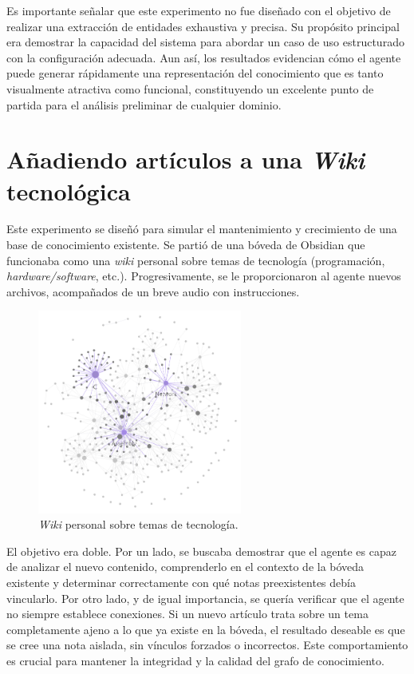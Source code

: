 Es importante señalar que este experimento no fue diseñado con el objetivo de realizar una extracción de entidades exhaustiva y precisa. Su propósito principal era demostrar la capacidad del sistema para abordar un caso de uso estructurado con la configuración adecuada. Aun así, los resultados evidencian cómo el agente puede generar rápidamente una representación del conocimiento que es tanto visualmente atractiva como funcional, constituyendo un excelente punto de partida para el análisis preliminar de cualquier dominio.

\section{Añadiendo artículos a una \textit{Wiki} tecnológica}
Este experimento se diseñó para simular el mantenimiento y crecimiento de una base de conocimiento existente. Se partió de una bóveda de Obsidian que funcionaba como una \textit{wiki} personal sobre temas de tecnología (programación, \textit{hardware/software}, etc.). Progresivamente, se le proporcionaron al agente nuevos archivos, acompañados de un breve audio con instrucciones.

\begin{figure}[h!]
    \centering
    \includegraphics[width=0.6\textwidth]{figures/WikiSamples2.png}
    \caption{\textit{Wiki} personal sobre temas de tecnología.}
    \label{fig:wiki_tech_graph}
\end{figure}

El objetivo era doble. Por un lado, se buscaba demostrar que el agente es capaz de analizar el nuevo contenido, comprenderlo en el contexto de la bóveda existente y determinar correctamente con qué notas preexistentes debía vincularlo. Por otro lado, y de igual importancia, se quería verificar que el agente no siempre establece conexiones. Si un nuevo artículo trata sobre un tema completamente ajeno a lo que ya existe en la bóveda, el resultado deseable es que se cree una nota aislada, sin vínculos forzados o incorrectos. Este comportamiento es crucial para mantener la integridad y la calidad del grafo de conocimiento.

